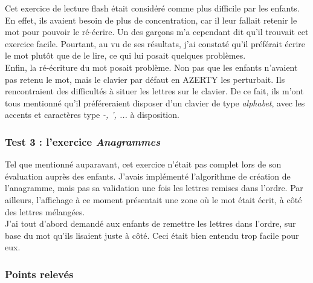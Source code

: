 Cet exercice de lecture flash était considéré comme plus difficile par les enfants. En effet, ils avaient besoin de plus de concentration, car il leur fallait retenir le mot pour pouvoir le ré-écrire. Un des garçons m'a cependant dit qu'il trouvait cet exercice facile. Pourtant, au vu de ses résultats, j'ai constaté qu'il préférait écrire le mot plutôt que de le lire, ce qui lui posait quelques problèmes.\\

Enfin, la ré-écriture du mot posait problème. Non pas que les enfants n'avaient pas retenu le mot, mais le clavier par défaut en AZERTY les perturbait. Ils rencontraient des difficultés à situer les lettres sur le clavier. De ce fait, ils m'ont tous mentionné qu'il préféreraient disposer d'un clavier de type \textit{alphabet}, avec les accents et caractères type \textit{-, ', ...} à disposition.

\subsubsection{Test 3 : l'exercice \textit{Anagrammes}}
Tel que mentionné auparavant, cet exercice n'était pas complet lors de son évaluation auprès des enfants. J'avais implémenté l'algorithme de création de l'anagramme, mais pas sa validation une fois les lettres remises dans l'ordre. Par ailleurs, l'affichage à ce moment présentait une zone où le mot était écrit, à côté des lettres mélangées.\\

J'ai tout d'abord demandé aux enfants de remettre les lettres dans l'ordre, sur base du mot qu'ils lisaient juste à côté. Ceci était bien entendu trop facile pour eux.

\subsubsection{Points relevés}